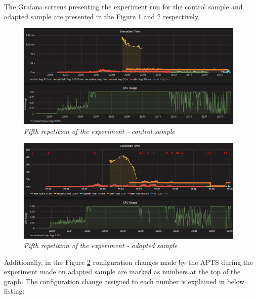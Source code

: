 \documentclass[12pt,a4paper]{article}
\begin{document}
The Grafana screens presenting the experiment run for the control sample and adapted sample are presented in the Figure \ref{figure:random:screen:control:5} and \ref{figure:random:screen:adapted:5} respectively. 

\begin{figure}[!htb]
\centering
\includegraphics[width=1\textwidth]{5-ctrl}
\caption{\textit{Fifth repetition of the experiment - control sample}} \label{figure:random:screen:control:5}
\end{figure}

\begin{figure}[!htb]
\centering
\includegraphics[width=1\textwidth]{5-adap}
\caption{\textit{Fifth repetition of the experiment - adapted sample}} \label{figure:random:screen:adapted:5}
\end{figure}

Additionally, in the Figure \ref{figure:random:screen:adapted:5} configuration changes made by the APTS during the experiment made on adapted sample are marked as numbers at the top of the graph. The configuration change assigned to each number is explained in below listing: 
\end{document}
